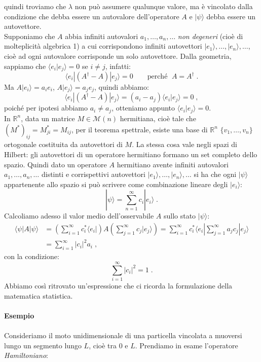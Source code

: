 \documentclass[10pt,a4paper]{report}
\theoremstyle{definition}
\numberwithin{equation}{section}
\newcommand{\bra}{\langle}
\newcommand{\ket}{\rangle}
\begin{document}
quindi troviamo che $\lambda$ non può assumere qualunque valore, ma è vincolato dalla condizione che debba essere un autovalore 
dell'operatore $A$ e $|\psi\ket$ debba essere un autovettore. \\
Supponiamo che $A$ abbia infiniti autovalori $a_1,\ldots,a_n,\ldots$ \textit{non degeneri} (cioè di molteplicità algebrica 1) a cui 
corrispondono infiniti autovettori $|e_1\ket,\ldots,|e_n\ket,\ldots$, cioè ad ogni autovalore corrisponde un solo autovettore. Dalla 
geometria, sappiamo che $\bra e_i|e_j\ket=0$ se $i\ne j$, infatti:
$$
\bra e_i|(A^{\dagger}-A)|e_j\ket=0 \qquad \mbox{perché }\; A=A^{\dagger}\;.
$$
Ma $A|e_i\ket=a_ie_i$, $A|e_j\ket=a_je_j$, quindi abbiamo:
$$
\bra e_i|(A^{\dagger}-A)|e_j\ket=(a_i-a_j)\bra e_i|e_j\ket=0\;,
$$
poiché per ipotesi abbiamo $a_i\ne a_j$, otteniamo appunto $\bra e_i|e_j\ket=0$. \\
In $\mathbb{R}^n$, data un matrice $M\in\mathcal{M}(n)$ hermitiana, cioè tale che $(M^*)_{ij}=M^*_{ji}=M_{ij}$, per il teorema spettrale, esiste una base di $\mathbb{R}^n$ $\{v_1,\ldots,v_n\}$ ortogonale costituita da autovettori di $M$. La stessa cosa vale negli spazi di Hilbert: gli autovettori di un operatore hermitiano formano un set completo dello spazio. Quindi dato un operatore $A$ hermitiano avente infiniti autovalori $a_1,\ldots,a_n,\ldots$ distinti e corrispettivi autovettori $|e_1\ket,\ldots,|e_n\ket,\ldots$ si ha che ogni $|\psi\ket$ appartenente allo spazio si può scrivere come combinazione lineare degli $|e_i\ket$:
$$
|\psi\ket=\sum_{n=1}^{\infty} c_i|e_i\ket\;.
$$
Calcoliamo adesso il valor medio dell'osservabile $A$ sullo stato $|\psi\ket$:
\begin{align*}
\bra\psi|A|\psi\ket &= \left(\sum_{i=1}^{\infty} c_i^* \bra e_i|\right)A\left(\sum_{j=1}^{\infty} c_j|e_j\ket\right)= \sum_{i=1}^{\infty} c_i^* \bra e_i|\sum_{j=1}^{\infty} a_jc_j|e_j\ket \\
&= \sum_{i=1}^{\infty} |c_i|^2a_i\;,
\end{align*}
con la condizione:
\begin{equation}
\sum_{i=1}^{\infty} |c_i|^2 =1\;.
\end{equation}
Abbiamo così ritrovato un'espressione che ci ricorda la formulazione della matematica statistica. \\
\\
\textbf{Esempio} \\
\\
Consideriamo il moto unidimensionale di una particella vincolata a muoversi lungo un segmento lungo $L$, cioè tra 0 e $L$. Prendiamo in esame l'operatore \textit{Hamiltoniano}:
\end{document}
